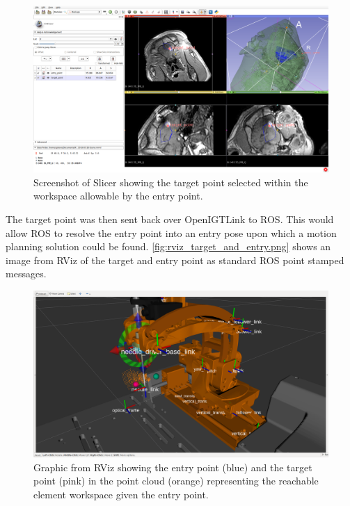\documentclass[12pt]{report}
\begin{document}
\begin{figure}[thpb]
	\centering
	\includegraphics[width=\textwidth]{images/slicer_target_point_selected.png}
    \caption{Screenshot of Slicer showing the target point selected within the workspace allowable by the entry point.}
    \label{fig:targetPointSelectedInSlicer}
\end{figure}

The target point was then sent back over OpenIGTLink to ROS. This would allow ROS to resolve the entry point into an entry pose upon which a motion planning solution could be found. \autoref{fig:rviz_target_and_entry.png} shows an image from RViz of the target and entry point as standard ROS point stamped messages.

\begin{figure}[thpb]
	\centering
	\includegraphics[width=\textwidth]{images/rviz_target_and_entry.png}
    \caption{Graphic from RViz showing the entry point (blue) and the target point (pink) in the point cloud (orange) representing the reachable element workspace given the entry point.}
    \label{fig:rviz_target_and_entry.png}
\end{figure}
\end{document}
